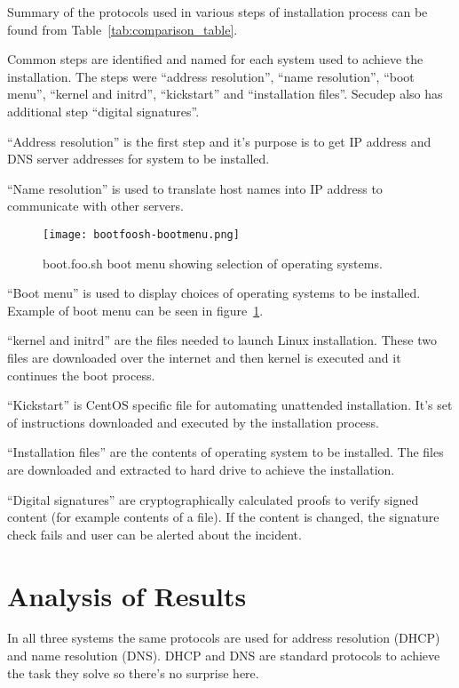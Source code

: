 Summary of the protocols used in various steps of installation process
can be found from Table~\ref{tab:comparison_table}.

Common steps are identified and named for each system used to achieve
the installation. The steps were ``address resolution'', ``name
resolution'', ``boot menu'', ``kernel and initrd'', ``kickstart'' and
``installation files''. Secudep also has additional step ``digital
signatures''.

``Address resolution'' is the first step and it's purpose is to get
IP address and DNS server addresses for system to be installed.

``Name resolution'' is used to translate host names into IP address to
communicate with other servers.

\begin{figure}[h]
  \texttt{[image: bootfoosh-bootmenu.png]}
  \caption{boot.foo.sh boot menu showing selection of operating
    systems.\label{fig:bootmenu}}
\end{figure}

``Boot menu'' is used to display choices of operating systems to be
installed. Example of boot menu can be seen in figure~\ref{fig:bootmenu}.

``kernel and initrd'' are the files needed to launch Linux
installation. These two files are downloaded over the internet and
then kernel is executed and it continues the boot process.

``Kickstart'' is CentOS specific file for automating unattended
installation. It's set of instructions downloaded and executed by the
installation process.

``Installation files'' are the contents of operating system to be
installed. The files are downloaded and extracted to hard drive to
achieve the installation.

``Digital signatures'' are cryptographically calculated proofs to
verify signed content (for example contents of a file). If the content
is changed, the signature check fails and user can be alerted about
the incident.

\section{Analysis of Results}

In all three systems the same protocols are used for address
resolution (DHCP) and name resolution (DNS). DHCP and DNS are standard
protocols to achieve the task they solve so there's no surprise here.

